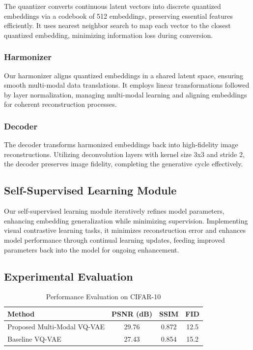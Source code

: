 \documentclass{article} %
\begin{document}
The quantizer converts continuous latent vectors into discrete quantized embeddings via a codebook of 512 embeddings, preserving essential features efficiently. It uses nearest neighbor search to map each vector to the closest quantized embedding, minimizing information loss during conversion.

\subsubsection{Harmonizer}

Our harmonizer aligns quantized embeddings in a shared latent space, ensuring smooth multi-modal data translations. It employs linear transformations followed by layer normalization, managing multi-modal learning and aligning embeddings for coherent reconstruction processes.

\subsubsection{Decoder}

The decoder transforms harmonized embeddings back into high-fidelity image reconstructions. Utilizing deconvolution layers with kernel size 3x3 and stride 2, the decoder preserves image fidelity, completing the generative cycle effectively.

\subsection{Self-Supervised Learning Module}

Our self-supervised learning module iteratively refines model parameters, enhancing embedding generalization while minimizing supervision. Implementing visual contrastive learning tasks, it minimizes reconstruction error and enhances model performance through continual learning updates, feeding improved parameters back into the model for ongoing enhancement.

\subsection{Experimental Evaluation}

\begin{table}[ht]
    \centering
    \begin{tabular}{lccc}
        \toprule
        Method & PSNR (dB) & SSIM & FID \\
        \midrule
        Proposed Multi-Modal VQ-VAE & 29.76 & 0.872 & 12.5 \\
        Baseline VQ-VAE & 27.43 & 0.854 & 15.2 \\
        \bottomrule
    \end{tabular}
    \caption{Performance Evaluation on CIFAR-10}
    \label{tab:performance}
\end{table}
\end{document}
